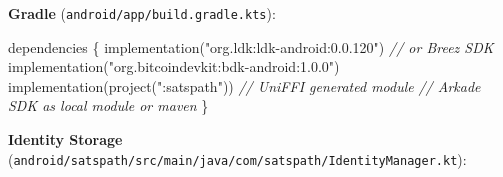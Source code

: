\documentclass[
]{article}
\newenvironment{Shaded}{}{}
\newcommand{\CommentTok}[1]{\textcolor[rgb]{0.38,0.63,0.69}{\textit{#1}}}
\newcommand{\NormalTok}[1]{#1}
\newcommand{\OperatorTok}[1]{\textcolor[rgb]{0.40,0.40,0.40}{#1}}
\newcommand{\StringTok}[1]{\textcolor[rgb]{0.25,0.44,0.63}{#1}}
\begin{document}
\textbf{Gradle} (\texttt{android/app/build.gradle.kts}):

\begin{Shaded}
\begin{Highlighting}[]
\NormalTok{dependencies }\OperatorTok{\{}
\NormalTok{    implementation}\OperatorTok{(}\StringTok{"org.ldk:ldk{-}android:0.0.120"}\OperatorTok{)}  \CommentTok{// or Breez SDK}
\NormalTok{    implementation}\OperatorTok{(}\StringTok{"org.bitcoindevkit:bdk{-}android:1.0.0"}\OperatorTok{)}
\NormalTok{    implementation}\OperatorTok{(}\NormalTok{project}\OperatorTok{(}\StringTok{":satspath"}\OperatorTok{))}  \CommentTok{// UniFFI generated module}
    \CommentTok{// Arkade SDK as local module or maven}
\OperatorTok{\}}
\end{Highlighting}
\end{Shaded}

\textbf{Identity Storage}
(\texttt{android/satspath/src/main/java/com/satspath/IdentityManager.kt}):
\end{document}
